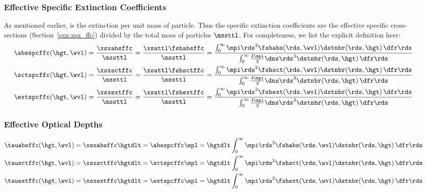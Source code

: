\documentclass[12pt]{article}
\begin{document}
\subsubsection[Effective Specific Extinction Coefficients]{Effective Specific Extinction Coefficients}\label{sxn:mac_ffc}
As mentioned earlier,  is the extinction
per unit mass of particle.
Thus the specific extinction coefficients are the effective specific
cross-sections (Section~\ref{sxn:xsx_ffc}) divided by the total mass
of particles $\mssttl$.
For completeness, we list the explicit definition here:
\begin{subequations}
\label{eqn:spc_ffc}
\begin{align}
\label{eqn:abs_spc_ffc}
\absspcffc(\hgt,\wvl) & = \frac{\xsxabsffc}{\mssttl} = 
\frac{\xsattl \fshabsffc}{\mssttl} =
\frac{\int_{0}^{\infty}
\mpi \rds^{2} \fshabs(\rds,\wvl) \dstnbr(\rds,\hgt) \,\dfr\rds}
{\int_{0}^{\infty}
\frac{4\mpi}{3} \dns \rds^{3} \dstnbr(\rds,\hgt) \,\dfr\rds} \\
\label{eqn:sct_spc_ffc}
\sctspcffc(\hgt,\wvl) & = \frac{\xsxsctffc}{\mssttl} = 
\frac{\xsattl \fshsctffc}{\mssttl} =
\frac{\int_{0}^{\infty}
\mpi \rds^{2} \fshsct(\rds,\wvl) \dstnbr(\rds,\hgt) \,\dfr\rds}
{\int_{0}^{\infty}
\frac{4\mpi}{3} \dns \rds^{3} \dstnbr(\rds,\hgt) \,\dfr\rds} \\
\label{eqn:ext_spc_ffc}
\extspcffc(\hgt,\wvl) & = \frac{\xsxextffc}{\mssttl} = 
\frac{\xsattl \fshextffc}{\mssttl} =
\frac{\int_{0}^{\infty}
\mpi \rds^{2} \fshext(\rds,\wvl) \dstnbr(\rds,\hgt) \,\dfr\rds}
{\int_{0}^{\infty}
\frac{4\mpi}{3} \dns \rds^{3} \dstnbr(\rds,\hgt) \,\dfr\rds}
\end{align}
\end{subequations}

\subsubsection[Effective Optical Depths]{Effective Optical Depths}\label{sxn:tau_ffc}
\begin{subequations}
\label{eqn:tau_ffc}
\begin{align}
\label{eqn:tau_abs_ffc}
\tauabsffc(\hgt,\wvl) & = \xsxabsffc \hgtdlt = \absspcffc \mpl =
\hgtdlt \int_{0}^{\infty}
\mpi \rds^{2} \fshabs(\rds,\wvl) \dstnbr(\rds,\hgt) \,\dfr\rds \\
\label{eqn:tau_sct_ffc}
\tausctffc(\hgt,\wvl) & = \xsxsctffc \hgtdlt = \sctspcffc \mpl =
\hgtdlt \int_{0}^{\infty}
\mpi \rds^{2} \fshsct(\rds,\wvl) \dstnbr(\rds,\hgt) \,\dfr\rds \\
\label{eqn:tau_ext_ffc}
\tauextffc(\hgt,\wvl) & = \xsxextffc \hgtdlt = \extspcffc \mpl =
\hgtdlt \int_{0}^{\infty}
\mpi \rds^{2} \fshext(\rds,\wvl) \dstnbr(\rds,\hgt) \,\dfr\rds
\end{align}
\end{subequations}
\end{document}

